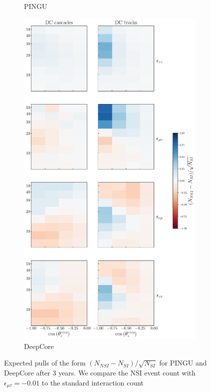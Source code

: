 \documentclass[draft=True]{revtex4-2}
\newcommand{\emt}{\ensuremath{\epsilon_{\mu\tau}}}
\begin{document}
{{\begin{figure}[t]
\begin{center}
\begin{subfigure}{0.38\textwidth}
         \caption{PINGU}\label{fig:PINGU_event_pulls}
      \end{subfigure}
      \begin{subfigure}{0.4\textwidth}
         \includegraphics[width=1\linewidth]{figures/DC_event_pulls.pdf}
         \caption{DeepCore}\label{fig:DC_event_pulls}
      \end{subfigure}
    \end{center}
   \caption{Expected pulls of the form $(N_{NSI} - N_{SI})/\sqrt{N_{SI}}$ for PINGU and DeepCore after 3 years. We compare the NSI event count with $\emt=-0.01$
    to the standard interaction count}\label{fig:event_pulls} 
\end{figure}%

}}
\end{document}
